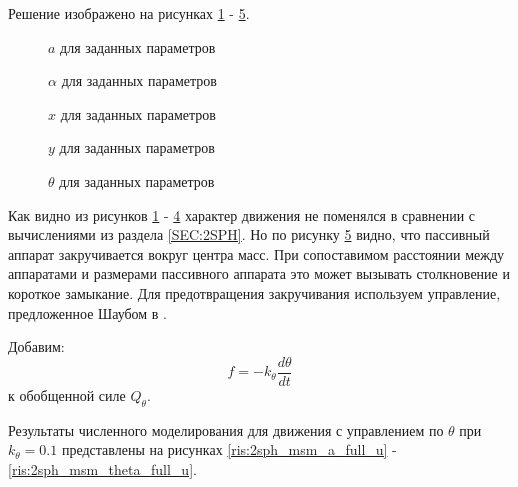 Решение изображено на рисунках \ref{ris:2sph_msm_a_no_u} - \ref{ris:2sph_msm_theta_no_u}.

\begin{figure}[H]
	\caption{$a$ для заданных параметров}
	\label{ris:2sph_msm_a_no_u}
\end{figure}
\begin{figure}[H]
	\caption{$\alpha$ для заданных параметров}
	\label{ris:2sph_msm_alpha_no_u}
\end{figure} 
\begin{figure}[H]
	\caption{$x$ для заданных параметров}
	\label{ris:2sph_msm_x_no_u}
\end{figure} 
\begin{figure}[H]
	\caption{$y$ для заданных параметров}
	\label{ris:2sph_msm_y_no_u}
\end{figure} 
\begin{figure}[H]
	\caption{$\theta$ для заданных параметров}
	\label{ris:2sph_msm_theta_no_u}
\end{figure}

Как видно из рисунков \ref{ris:2sph_msm_a_no_u} - \ref{ris:2sph_msm_y_no_u} характер движения не поменялся в сравнении с вычислениями из раздела \ref{SEC:2SPH}.
Но по рисунку \ref{ris:2sph_msm_theta_no_u} видно, что пассивный аппарат закручивается вокруг центра масс.
При сопоставимом расстоянии между аппаратами и размерами пассивного аппарата это может вызывать столкновение и короткое замыкание.
Для предотвращения закручивания используем управление, предложенное Шаубом в \cite{3sph}.

Добавим:
\begin{equation}
\label{eq:2sph_msm_f}
	f = - k_\theta \frac{d\theta}{dt}
\end{equation}
к обобщенной силе $Q_\theta$.

Результаты численного моделирования для движения с управлением по $\theta$ при $k_\theta = 0.1$ представлены на рисунках \ref{ris:2sph_msm_a_full_u} - \ref{ris:2sph_msm_theta_full_u}.

